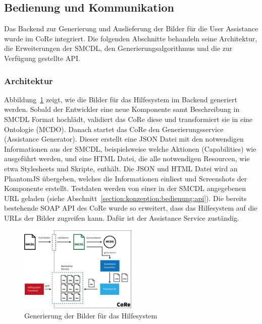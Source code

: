 \documentclass[
	headsepline,
	footsepline,
	fontsize=12pt,
	bibliography=totoc
]{scrbook}
\begin{document}
\subsection{Bedienung und Kommunikation}
\label{section:implementierung:backend:bedienung}

Das Backend zur Generierung und Auslieferung der Bilder für die User Assistance wurde im CoRe integriert. Die folgenden Abschnitte behandeln seine Architektur, die Erweiterungen der SMCDL, den Generierungsalgorithmus und die zur Verfügung gestellte API.

\subsubsection{Architektur}

Abbildung~\ref{figure:bedienung-backend} zeigt, wie die Bilder für das Hilfesystem im Backend generiert werden. Sobald der Entwickler eine neue Komponente samt Beschreibung in SMCDL Format hochlädt, validiert das CoRe diese und transformiert sie in eine Ontologie (MCDO). Danach startet das CoRe den Generierungsservice (Assistance Generator). Dieser erstellt eine JSON Datei mit den notwendigen Informationen aus der SMCDL, beispielsweise welche Aktionen (Capabilities) wie ausgeführt werden, und eine HTML Datei, die alle notwendigen Resourcen, wie etwa Stylesheets und Skripte, enthält. Die JSON und HTML Datei wird an PhantomJS übergeben, welches die Informationen einliest und Screenshots der Komponente erstellt. Testdaten werden von einer in der SMCDL angegebenen URL geladen (siehe Abschnitt~\ref{section:konzeption:bedienung:api}). Die bereits bestehende SOAP API des CoRe wurde so erweitert, dass das Hilfesystem auf die URLs der Bilder zugreifen kann. Dafür ist der Assistance Service zuständig.

\begin{figure}[htbp]
   \centering
   \includegraphics[width=0.5\textwidth]{images/implementierung-bedienung-backend.png}
   \caption{Generierung der Bilder für das Hilfesystem}
   \label{figure:bedienung-backend}
\end{figure}
\end{document}
